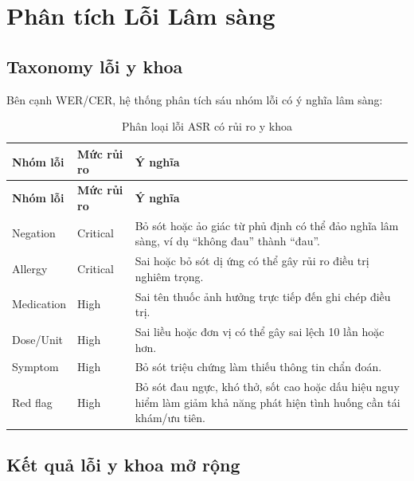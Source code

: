 \documentclass[12pt,a4paper]{article}
\begin{document}
\section{Phân tích Lỗi Lâm sàng}

\subsection{Taxonomy lỗi y khoa}

Bên cạnh WER/CER, hệ thống phân tích sáu nhóm lỗi có ý nghĩa lâm sàng:

\begin{longtable}{|p{3.2cm}|p{2.6cm}|p{7.5cm}|}
\caption{Phân loại lỗi ASR có rủi ro y khoa}\\
\hline
\textbf{Nhóm lỗi} & \textbf{Mức rủi ro} & \textbf{Ý nghĩa} \\
\hline
\endfirsthead

\hline
\textbf{Nhóm lỗi} & \textbf{Mức rủi ro} & \textbf{Ý nghĩa} \\
\hline
\endhead

Negation & Critical & Bỏ sót hoặc ảo giác từ phủ định có thể đảo nghĩa lâm sàng, ví dụ ``không đau'' thành ``đau''. \\
\hline
Allergy & Critical & Sai hoặc bỏ sót dị ứng có thể gây rủi ro điều trị nghiêm trọng. \\
\hline
Medication & High & Sai tên thuốc ảnh hưởng trực tiếp đến ghi chép điều trị. \\
\hline
Dose/Unit & High & Sai liều hoặc đơn vị có thể gây sai lệch 10 lần hoặc hơn. \\
\hline
Symptom & High & Bỏ sót triệu chứng làm thiếu thông tin chẩn đoán. \\
\hline
Red flag & High & Bỏ sót đau ngực, khó thở, sốt cao hoặc dấu hiệu nguy hiểm làm giảm khả năng phát hiện tình huống cần tái khám/ưu tiên. \\
\hline
\end{longtable}

\subsection{Kết quả lỗi y khoa mở rộng}

\begin{table}[h]
\centering
\caption{Lỗi y khoa trên tập dev, bao gồm ChunkFormer}
\end{table}
\end{document}
